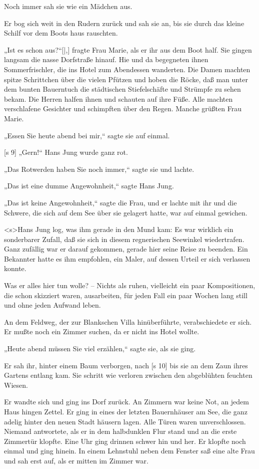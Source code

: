 Noch immer sah sie wie ein Mädchen aus.

Er bog sich weit in den Rudern zurück und sah
sie an, bis sie durch das kleine Schilf vor dem Boots­
haus rauschten.

„Ist es schon aus?“[|,] fragte Frau Marie, als er ihr
aus dem Boot half. Sie gingen langsam die nasse
Dorfstraße hinauf. Hie und da begegneten ihnen
Sommerfrischler, die ins Hotel zum Abendessen
wanderten. Die Damen machten spitze Schrittchen
über die vielen Pfützen und hoben die Röcke, daß
man unter dem bunten Bauerntuch die städtischen
Stiefelschäfte und Strümpfe zu sehen bekam. Die
Herren halfen ihnen und schauten auf ihre Füße.
Alle machten verschlafene Gesichter und schimpften
über den Regen. Manche grüßten Frau Marie.

„Essen Sie heute abend bei mir,“ sagte sie auf
einmal.

[s 9]
„Gern!“ Hans Jung wurde ganz rot.

„Das Rotwerden haben Sie noch immer,“ sagte
sie und lachte.

„Das ist eine dumme Angewohnheit,“ sagte
Hans Jung.

„Das ist keine Angewohnheit,“ sagte die Frau,
und er lachte mit ihr und die Schwere, die sich
auf dem See über sie gelagert hatte, war auf einmal
gewichen.

<s>Hans Jung log, was ihm gerade in den Mund
kam: Es war wirklich ein sonderbarer Zufall, daß
sie sich in diesem regnerischen Seewinkel wiedertrafen.
Ganz zufällig war er darauf gekommen, gerade hier
seine Reise zu beenden. Ein Bekannter hatte es
ihm empfohlen, ein Maler, auf dessen Urteil er sich
verlassen konnte.

Was er alles hier tun wolle? – Nichts als ruhen,
vielleicht ein paar Kompositionen, die schon skizziert
waren, ausarbeiten, für jeden Fall ein paar Wochen
lang still und ohne jeden Aufwand leben.

An dem Feldweg, der zur Blankschen Villa
hinüberführte, verabschiedete er sich. Er mußte noch
ein Zimmer suchen, da er nicht ins Hotel wollte.

„Heute abend müssen Sie viel erzählen,“ sagte
sie, als sie ging.

Er sah ihr, hinter einem Baum verborgen, nach
[s 10]
bis sie an dem Zaun ihres Gartens entlang kam.
Sie schritt wie verloren zwischen den abgeblühten
feuchten Wiesen.

Er wandte sich und ging ins Dorf zurück. An
Zimmern war keine Not, an jedem Haus hingen
Zettel. Er ging in eines der letzten Bauernhäuser
am See, die ganz adelig hinter den neuen Stadt­
häusern lagen. Alle Türen waren unverschlossen.
Niemand antwortete, als er in dem halbdunklen Flur
stand und an die erste Zimmertür klopfte. Eine Uhr
ging drinnen schwer hin und her. Er klopfte noch
einmal und ging hinein. In einem Lehnstuhl neben
dem Fenster saß eine alte Frau und sah erst auf,
als er mitten im Zimmer war.

